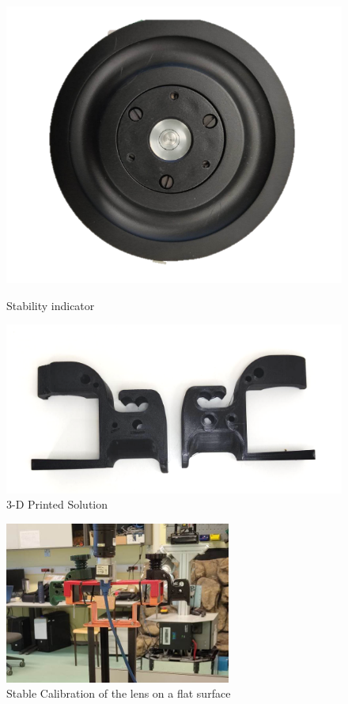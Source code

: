 \documentclass[11pt, a4paper, openany]{book}
\begin{document}
\begin{figure}[H]
  \centering
  \begin{minipage}[b]{0.4\textwidth}
  \begin{center}
    \includegraphics[scale=0.5]{Labbot&ele/o10.png}
    \caption{Stability indicator}
    \label{fig:stability}  
      \end{center}
  \end{minipage}
  \hfill
  \begin{minipage}[b]{0.4\textwidth}
    \includegraphics[scale=0.6]{Labbot&ele/qp1.png}
    \caption{3-D Printed Solution}
    \label{fig:stability}  
  \end{minipage}
\end{figure}

\begin{figure}[H]
    \centering
    \includegraphics[scale=0.9]{Labbot&ele/19.png}
    \caption{Stable Calibration of the lens on a flat surface}
    \label{fig:output} 
\end{figure}\
\end{document}
